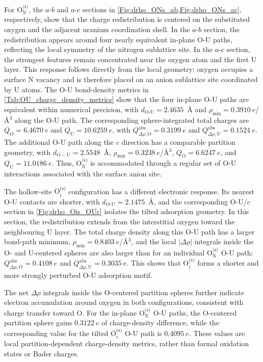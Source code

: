 \documentclass[preprint,12pt,sort&compress]{elsarticle}
\newcommand{\?}{\stackrel{?}{=}}
\begin{document}
For $\mathrm{O}_{\mathrm{N}}^{\text{(s)}}$, the $a$-$b$ and $a$-$c$ sections in \cref{Fig:drho_ONs_ab,Fig:drho_ONs_ac}, respectively, show that the charge redistribution is centered on the substituted oxygen and the adjacent uranium coordination shell. In the $a$-$b$ section, the redistribution appears around four nearly equivalent in-plane O-U paths, reflecting the local symmetry of the nitrogen sublattice site. In the $a$-$c$ section, the strongest features remain concentrated near the oxygen atom and the first U layer. This response follows directly from the local geometry: oxygen occupies a surface N vacancy and is therefore placed on an anion sublattice site coordinated by U atoms. The O-U bond-density metrics in \cref{Tab:OU_charge_density_metrics} show that the four in-plane O-U paths are equivalent within numerical precision, with $d_{\text{O-U}}=2.4635$~\AA{} and $\rho_\mathrm{min}=0.3910~e$/\AA{}$^{3}$ along the O-U path. The corresponding sphere-integrated total charges are $Q_\mathrm{O}=6.4670~e$ and $Q_\mathrm{U}=10.6259~e$, with $Q^\mathrm{abs}_{\Delta\rho,\mathrm{O}}=0.3199~e$ and $Q^\mathrm{abs}_{\Delta\rho,\mathrm{U}}=0.1524~e$. The additional O-U path along the $c$ direction has a comparable partition geometry, with $d_{\mathrm{O-U}}=2.5548$~\AA{}, $\rho_\mathrm{min}=0.3238~e$/\AA{}$^{3}$, $Q_\mathrm{O}=6.6247~e$, and $Q_\mathrm{U}=11.0186~e$. Thus, $\mathrm{O}_{\mathrm{N}}^{\text{(s)}}$ is accommodated through a regular set of O-U interactions associated with the surface anion site.

The hollow-site $\mathrm{O}_i^{\text{(s)}}$ configuration has a different electronic response. Its nearest O-U contacts are shorter, with $d_{\text{O-U}}=2.1475$~\AA{}, and the corresponding O-U/$c$ section in \cref{Fig:drho_Ois_OUc} isolates the tilted adsorption geometry. In this section, the redistribution extends from the interstitial oxygen toward the neighbouring U layer. The total charge density along this O-U path has a larger bond-path minimum, $\rho_\mathrm{min}=0.8403~e$/\AA{}$^{3}$, and the local $|\Delta\rho|$ integrals inside the O- and U-centered spheres are also larger than for an individual $\mathrm{O}_{\mathrm{N}}^{\text{(s)}}$ O-U path: $Q^\mathrm{abs}_{\Delta\rho,\mathrm{O}}=0.4108~e$ and $Q^\mathrm{abs}_{\Delta\rho,\mathrm{U}}=0.3035~e$. This shows that $\mathrm{O}_i^{\text{(s)}}$ forms a shorter and more strongly perturbed O-U adsorption motif.

The net $\Delta\rho$ integrals inside the O-centered partition spheres further indicate electron accumulation around oxygen in both configurations, consistent with charge transfer toward O. For the in-plane $\mathrm{O}_{\mathrm{N}}^{\text{(s)}}$ O-U paths, the O-centered partition sphere gains $0.3122~e$ of charge-density difference, while the corresponding value for the tilted $\mathrm{O}_i^{\text{(s)}}$ O-U path is $0.4095~e$. These values are local partition-dependent charge-density metrics, rather than formal oxidation states or Bader charges.
\end{document}
